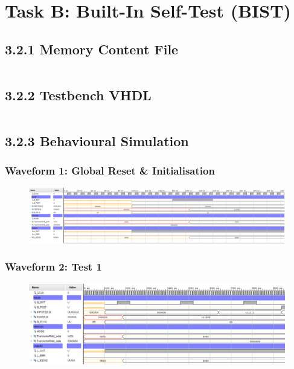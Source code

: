 \documentclass[11pt]{report}
\begin{document}
\chapter*{Task B: Built-In Self-Test (BIST)}


\section*{3.2.1 Memory Content File}
\inputminted{text}{"../../DE_Lab4/DE_Lab4.srcs/sources_1/imports/Desktop/lab4_coefficient.coe"}


\section*{3.2.2 Testbench VHDL}
\inputminted{vhdl}{"../../DE_Lab4/DE_Lab4.srcs/sim_1/new/bist_tb.vhd"}



\section*{3.2.3 Behavioural Simulation}

\subsection*{Waveform 1: Global Reset \& Initialisation}
\begin{figure}[H]
    \includegraphics[width=\columnwidth]{Assets/3.2.3_reset.png}
\end{figure}

\subsection*{Waveform 2: Test 1}
\begin{figure}[H]
    \includegraphics[width=\columnwidth]{Assets/3.2.3_test1.png}
\end{figure}
\end{document}
